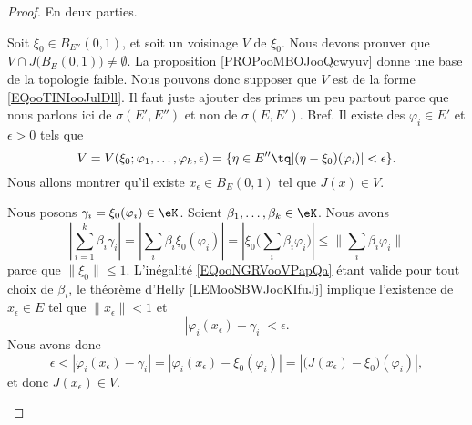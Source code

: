 \begin{proof}
	En deux parties.
	\begin{subproof}
		Soit \( \xi_0\in B_{E''}(0,1)\), et soit un voisinage \( V\) de \( \xi_0\). Nous devons prouver que \( V\cap J\big( B_E(0,1) \big)\neq \emptyset\). La proposition \ref{PROPooMBOJooQcwyuv} donne une base de la topologie faible. Nous pouvons donc supposer que \( V\) est de la forme \eqref{EQooTINIooJulDll}. Il faut juste ajouter des primes un peu partout parce que nous parlons ici de \( \sigma(E',E'') \) et non de \( \sigma(E,E')\). Bref. Il existe des \( \varphi_i\in E'\) et \( \epsilon>0\) tels que
		\begin{equation}
			V=V(\xi_0;\varphi_1,\ldots,\varphi_k,\epsilon)=\{ \eta\in E''\tq | (\eta-\xi_0)(\varphi_i) |<\epsilon \}.
		\end{equation}
		Nous allons montrer qu'il existe \( x_{\epsilon}\in B_E(0,1)\) tel que \( J(x)\in V\).

		Nous posons \( \gamma_i=\xi_0(\varphi_i)\in \eK\). Soient \( \beta_1,\ldots,\beta_k\in \eK\). Nous avons
		\begin{equation}		\label{EQooNGRVooVPapQa}
			|\sum_{i=1}^k\beta_i\gamma_i|=|\sum_i\beta_i\xi_0(\varphi_i)|=|\xi_0\big( \sum_i\beta_i\varphi_i \big)|\leq \| \sum_i\beta_i\varphi_i \|
		\end{equation}
		parce que \( \| \xi_0 \|\leq 1\). L'inégalité \eqref{EQooNGRVooVPapQa} étant valide pour tout choix de \( \beta_i\), le théorème d'Helly \ref{LEMooSBWJooKIfuJj} implique l'existence de \( x_{\epsilon}\in E\) tel que \( \| x_{\epsilon} \|<1\) et
		\begin{equation}
			| \varphi_i(x_{\epsilon})-\gamma_i |<\epsilon.
		\end{equation}
		Nous avons donc
		\begin{equation}
			\epsilon<| \varphi_i(x_{\epsilon})-\gamma_i |=| \varphi_i(x_{\epsilon})-\xi_0(\varphi_i) |=| \big( J(x_{\epsilon})-\xi_0 \big)(\varphi_i) |,
		\end{equation}
		et donc \( J(x_{\epsilon})\in V\).


\end{subproof}
\end{proof}
